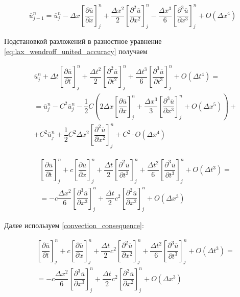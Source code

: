 \begin{equation*}
	\overline{u}_{j-1}^n = \overline{u}_j^n - \Delta x \left[ \dfrac{\partial \overline{u}}{\partial x} \right]_j^n + \dfrac{\Delta x^2}{2} \left[ \dfrac{\partial^2 \overline{u}}{\partial x^2} \right]_j^n -
	\dfrac{\Delta x^3}{6} \left[ \dfrac{\partial^3 \overline{u}}{\partial x^3} \right]_j^n 
	+ O(\Delta x^4)
\end{equation*}


Подстановкой разложений в разностное уравнение \eqref{eq:lax_wendroff_united_accuracy} получаем

\begin{equation}
\begin{split}
	&\overline{u}_j^n + \Delta t \left[ \dfrac{\partial \overline{u}}{\partial t} \right]_j^n + \dfrac{\Delta t^2}{2} \left[ \dfrac{\partial^2 \overline{u}}{\partial t^2} \right]_j^n + \dfrac{\Delta t^3}{6} \left[ \dfrac{\partial^3 \overline{u}}{\partial t^3} \right]_j^n + O(\Delta t^4) = \\
	&=\overline{u}_j^n - C^2 \overline{u}_j^n - \dfrac{1}{2} C
	\left( 2 \Delta x \left[ \dfrac{\partial \overline{u}}{\partial x} \right]_j^n + \dfrac{\Delta x^3}{3} \left[ \dfrac{\partial^3 \overline{u}}{\partial x^3} \right]_j^n + O(\Delta x^5) \right) + \\
	&+ C^2 \overline{u}_j^n + \dfrac{1}{2} C^2 \Delta x^2 \left[ \dfrac{\partial^2 \overline{u}}{\partial x^2} \right]_j^n + C^2 \cdot O(\Delta x^4)
\end{split}
\end{equation}

\begin{equation}
\begin{split}
	&\left[ \dfrac{\partial \overline{u}}{\partial t} \right]_j^n + c \left[ \dfrac{\partial \overline{u}}{\partial x} \right]_j^n + \dfrac{\Delta t}{2} \left[ \dfrac{\partial^2 \overline{u}}{\partial t^2} \right]_j^n + \dfrac{\Delta t^2}{6} \left[ \dfrac{\partial^3 \overline{u}}{\partial t^3} \right]_j^n + O(\Delta t^3) = \\
	&=- c \dfrac{\Delta x^2}{6} \left[ \dfrac{\partial^3 \overline{u}}{\partial x^3} \right]_j^n + \dfrac{\Delta t}{2} c^2 \left[ \dfrac{\partial^2 \overline{u}}{\partial x^2} \right]_j^n + O(\Delta x^3)
\end{split}
\end{equation}

Далее используем \eqref{convection_consequence}:

\begin{equation}
\begin{split}
	&\left[ \dfrac{\partial \overline{u}}{\partial t} \right]_j^n + c \left[ \dfrac{\partial \overline{u}}{\partial x} \right]_j^n + \dfrac{\Delta t}{2} c^2 \left[ \dfrac{\partial^2 \overline{u}}{\partial x^2} \right]_j^n + \dfrac{\Delta t^2}{6} \left[ \dfrac{\partial^3 \overline{u}}{\partial t^3} \right]_j^n + O(\Delta t^3) = \\
	&=- c \dfrac{\Delta x^2}{6} \left[ \dfrac{\partial^3 \overline{u}}{\partial x^3} \right]_j^n + \dfrac{\Delta t}{2} c^2 \left[ \dfrac{\partial^2 \overline{u}}{\partial x^2} \right]_j^n + O(\Delta x^3)
\end{split}
\end{equation}

